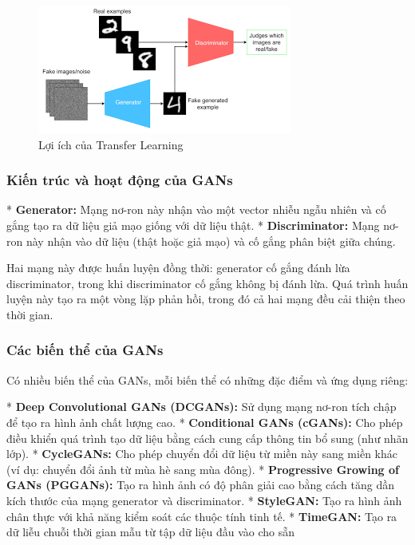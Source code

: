  \begin{figure}[H]
    \centering
    \includegraphics[scale = 0.2]{Images/Theoretical basis/GAN.png}
\caption{Lợi ích của Transfer Learning}
\end{figure}

\subsubsection{Kiến trúc và hoạt động của GANs}

* \textbf{Generator:} Mạng nơ-ron này nhận vào một vector nhiễu ngẫu nhiên và cố gắng tạo ra dữ liệu giả mạo giống với dữ liệu thật.
* \textbf{Discriminator:} Mạng nơ-ron này nhận vào dữ liệu (thật hoặc giả mạo) và cố gắng phân biệt giữa chúng.

Hai mạng này được huấn luyện đồng thời: generator cố gắng đánh lừa discriminator, trong khi discriminator cố gắng không bị đánh lừa. Quá trình huấn luyện này tạo ra một vòng lặp phản hồi, trong đó cả hai mạng đều cải thiện theo thời gian.

\subsubsection{Các biến thể của GANs}

Có nhiều biến thể của GANs, mỗi biến thể có những đặc điểm và ứng dụng riêng:

* \textbf{Deep Convolutional GANs (DCGANs):} Sử dụng mạng nơ-ron tích chập để tạo ra hình ảnh chất lượng cao.
* \textbf{Conditional GANs (cGANs):} Cho phép điều khiển quá trình tạo dữ liệu bằng cách cung cấp thông tin bổ sung (như nhãn lớp).
* \textbf{CycleGANs:} Cho phép chuyển đổi dữ liệu từ miền này sang miền khác (ví dụ: chuyển đổi ảnh từ mùa hè sang mùa đông).
* \textbf{Progressive Growing of GANs (PGGANs):}  Tạo ra hình ảnh có độ phân giải cao bằng cách tăng dần kích thước của mạng generator và discriminator.
* \textbf{StyleGAN:} Tạo ra hình ảnh chân thực với khả năng kiểm soát các thuộc tính tinh tế.
* \textbf{TimeGAN:} Tạo ra dữ liễu chuỗi thời gian mẫu từ tập dữ liệu đầu vào cho sẵn

